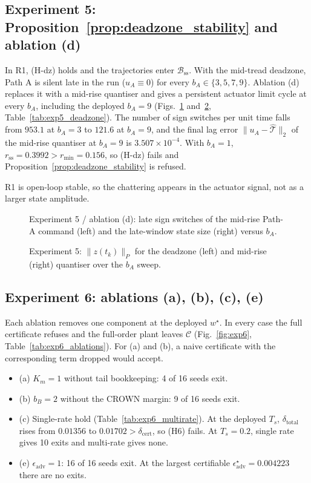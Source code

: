 

\subsection{Experiment 5: Proposition~\ref{prop:deadzone_stability} and ablation (d)}
In R1, (H-dz) holds and the trajectories enter \(\mathcal B_{\mathrm{ss}}\). With the mid-tread deadzone, Path A is
silent late in the run (\(u_A \equiv 0\)) for every \(b_A \in \{3, 5, 7, 9\}\). Ablation (d) replaces it with a
mid-rise quantiser and gives a persistent actuator limit cycle at every \(b_A\), including the deployed
\(b_A = 9\) (Figs.~\ref{fig:exp5} and~\ref{fig:exp5z}, Table~\ref{tab:exp5_deadzone}). The number of sign switches per unit time
falls from \(953.1\) at \(b_A = 3\) to \(121.6\) at \(b_A = 9\), and the final lag error \(\|u_A - \hat{\mathcal T}\|_2\) of the mid-rise quantiser at
\(b_A = 9\) is \(3.507\times10^{-4}\). With \(b_A = 1\), \(r_{\mathrm{ss}} = 0.3992 > r_{\min} = 0.156\), so (H-dz) fails and
Proposition~\ref{prop:deadzone_stability} is refused.

R1 is open-loop stable, so the chattering appears in the actuator signal, not as a larger state amplitude.

\begin{figure}[t]\centering{}
\caption{Experiment 5 / ablation (d): late sign switches of the mid-rise Path-A command (left) and the late-window state
size (right) versus \(b_A\).}\label{fig:exp5}\end{figure}
\begin{figure}[t]\centering{}
\caption{Experiment 5: \(\|z(t_k)\|_P\) for the deadzone (left) and mid-rise (right) quantiser over the \(b_A\) sweep.}\label{fig:exp5z}\end{figure}


\subsection{Experiment 6: ablations (a), (b), (c), (e)}
Each ablation removes one component at the deployed \(w^\star\). In every case the full certificate refuses and the
full-order plant leaves \(\mathcal C\) (Fig.~\ref{fig:exp6}, Table~\ref{tab:exp6_ablations}). For (a) and (b), a naive
certificate with the corresponding term dropped would accept.
\begin{itemize}
\item (a) \(K_m = 1\) without tail bookkeeping: 4 of 16 seeds exit.
\item (b) \(b_B = 2\) without the CROWN margin: 9 of 16 seeds exit.
\item (c) Single-rate hold (Table~\ref{tab:exp6_multirate}). At the deployed \(T_s\), \(\delta_{\mathrm{total}}\) rises from
\(0.01356\) to \(0.01702 > \delta_{\mathrm{cert}}\), so (H6) fails. At \(T_s = 0.2\), single rate gives
10 exits and multi-rate gives none.
\item (e) \(\epsilon_{\mathrm{adv}} = 1\): 16 of 16 seeds exit. At the largest certifiable
\(\epsilon_{\mathrm{adv}}^\star = 0.004223\) there are no exits.
\end{itemize}

